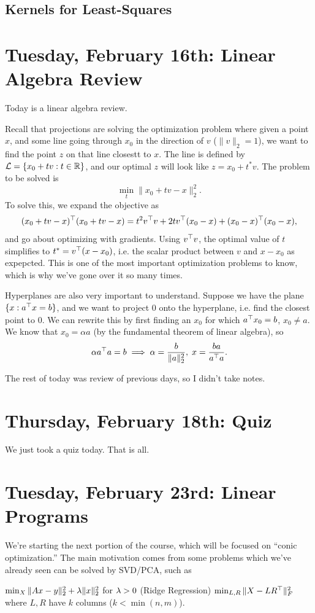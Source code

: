 \documentclass[11 pt]{scrartcl}
\begin{document}
\subsection{Kernels for Least-Squares}


\newpage
\section{Tuesday, February 16th: Linear Algebra Review}
Today is a linear algebra review.

Recall that projections are solving the optimization problem where given a point $x$, and some line going through $x_0$ in the direction of $v$ ($\|v\|_2 = 1$), we want to find the point $z$ on that line closestt to $x$. 
The line is defined by $\mathcal L = \{x_0 + tv : t\in \mathbb R\}$, and our optimal $z$ will look like $z = x_0 + t^* v$. 
The problem to be solved is 
\[ \min_t \|x_0 + tv - x\|_2^2.\] 
To solve this, we expand the objective as 
\[ (x_0+tv - x)^\top (x_0 + tv - x) =  t^2 v^\top v + 2tv^\top (x_0-x) + (x_0-x)^\top (x_0 - x) ,\]
and go about optimizing with gradients. 
Using $v^\top v$, the optimal value of $t$ simplifies to $t^* = v^\top (x-x_0)$, i.e. the scalar product between $v$ and $x-x_0$ as expepcted. 
This is one of the most important optimization problems to know, which is why we've gone over it so many times.

Hyperplanes are also very important to understand. 
Suppose we have the plane $\{x: a^\top x = b\}$, and we want to project $0$ onto the hyperplane, i.e. find the closest point to 0.
We can rewrite this by first finding an $x_0$ for which $a^\top x_0 = b$, $x_0\not= a$. 
We know that $x_0 = \alpha a$ (by the fundamental theorem of linear algebra), so 
\[ \alpha a^\top a = b \implies \alpha = \frac{b}{\|a\|_2^2},\; x = \frac{ba}{a^\top a}.\]

The rest of today was review of previous days, so I didn't take notes.

\section{Thursday, February 18th: Quiz}
We just took a quiz today. 
That is all. 


\newpage
\section{Tuesday, February 23rd: Linear Programs}
We're starting the next portion of the course, which will be focused on ``conic optimization.'' 
The main motivation comes from some problems which we've already seen can be solved by SVD/PCA, such as 
\begin{itemize}
    \ii $\min_{X} \|Ax-y\|_2^2 + \lambda \|x\|_2^2$ for $\lambda > 0$ (Ridge Regression)
    \ii $\min_{L,R} \|X-LR^\top\|_F^2$ where $L, R$ have $k$ columns ($k < \min(n,m)$). 
\end{itemize}
\end{document}
